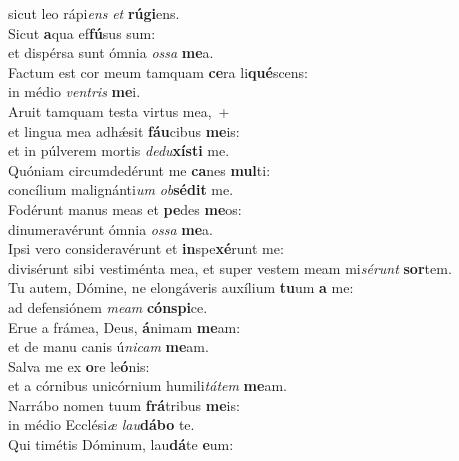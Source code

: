 \oddverse sicut leo rápi\textit{ens} \textit{et} \textbf{rú}\textbf{gi}ens.\\
\evenverse Sicut \textbf{a}qua ef\textbf{fú}sus sum:~\*\\
\evenverse et dispérsa sunt ómnia \textit{os}\textit{sa} \textbf{me}a.\\
\oddverse Factum est cor meum tamquam \textbf{ce}ra li\textbf{qué}scens:~\*\\
\oddverse in médio \textit{ven}\textit{tris} \textbf{me}i.\\
\evenverse Aruit tamquam testa virtus mea,~+\\
\evenverse  et lingua mea adhǽsit \textbf{fáu}cibus \textbf{me}is:~\*\\
\evenverse et in púlverem mortis \textit{de}\textit{du}\textbf{xí}\textbf{sti} me.\\
\oddverse Quóniam circumdedérunt me \textbf{ca}nes \textbf{mul}ti:~\*\\
\oddverse concílium malignánti\textit{um} \textit{ob}\textbf{sé}\textbf{dit} me.\\
\evenverse Fodérunt manus meas et \textbf{pe}des \textbf{me}os:~\*\\
\evenverse dinumeravérunt ómnia \textit{os}\textit{sa} \textbf{me}a.\\
\oddverse Ipsi vero consideravérunt et \textbf{in}spe\textbf{xé}runt me:~\*\\
\oddverse divisérunt sibi vestiménta mea, et super vestem meam mi\textit{sé}\textit{runt} \textbf{sor}tem.\\
\evenverse Tu autem, Dómine, ne elongáveris auxílium \textbf{tu}um \textbf{a} me:~\*\\
\evenverse ad defensiónem \textit{me}\textit{am} \textbf{cón}\textbf{spi}ce.\\
\oddverse Erue a frámea, Deus, \textbf{á}nimam \textbf{me}am:~\*\\
\oddverse et de manu canis ú\textit{ni}\textit{cam} \textbf{me}am.\\
\evenverse Salva me ex \textbf{o}re le\textbf{ó}nis:~\*\\
\evenverse et a córnibus unicórnium humili\textit{tá}\textit{tem} \textbf{me}am.\\
\oddverse Narrábo nomen tuum \textbf{frá}tribus \textbf{me}is:~\*\\
\oddverse in médio Ecclési\textit{æ} \textit{lau}\textbf{dá}\textbf{bo} te.\\
\evenverse Qui timétis Dóminum, lau\textbf{dá}te \textbf{e}um:~\*\\
